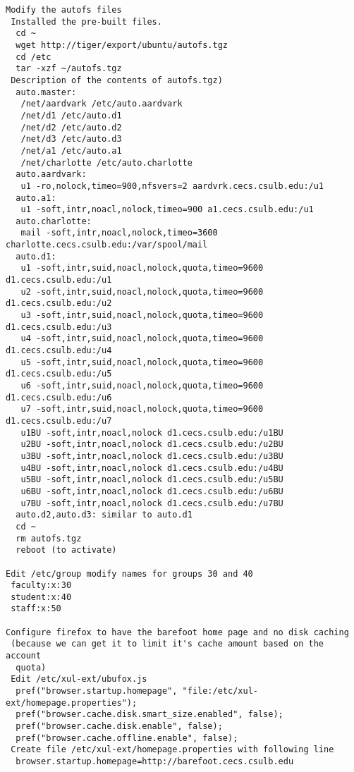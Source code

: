 \begin{verbatim}
Modify the autofs files
 Installed the pre-built files.
  cd ~
  wget http://tiger/export/ubuntu/autofs.tgz
  cd /etc
  tar -xzf ~/autofs.tgz
 Description of the contents of autofs.tgz)
  auto.master: 
   /net/aardvark /etc/auto.aardvark
   /net/d1 /etc/auto.d1
   /net/d2 /etc/auto.d2
   /net/d3 /etc/auto.d3
   /net/a1 /etc/auto.a1
   /net/charlotte /etc/auto.charlotte
  auto.aardvark:
   u1 -ro,nolock,timeo=900,nfsvers=2 aardvrk.cecs.csulb.edu:/u1
  auto.a1:
   u1 -soft,intr,noacl,nolock,timeo=900 a1.cecs.csulb.edu:/u1
  auto.charlotte:
   mail -soft,intr,noacl,nolock,timeo=3600 charlotte.cecs.csulb.edu:/var/spool/mail
  auto.d1:
   u1 -soft,intr,suid,noacl,nolock,quota,timeo=9600 d1.cecs.csulb.edu:/u1
   u2 -soft,intr,suid,noacl,nolock,quota,timeo=9600 d1.cecs.csulb.edu:/u2
   u3 -soft,intr,suid,noacl,nolock,quota,timeo=9600 d1.cecs.csulb.edu:/u3
   u4 -soft,intr,suid,noacl,nolock,quota,timeo=9600 d1.cecs.csulb.edu:/u4
   u5 -soft,intr,suid,noacl,nolock,quota,timeo=9600 d1.cecs.csulb.edu:/u5
   u6 -soft,intr,suid,noacl,nolock,quota,timeo=9600 d1.cecs.csulb.edu:/u6
   u7 -soft,intr,suid,noacl,nolock,quota,timeo=9600 d1.cecs.csulb.edu:/u7
   u1BU -soft,intr,noacl,nolock d1.cecs.csulb.edu:/u1BU
   u2BU -soft,intr,noacl,nolock d1.cecs.csulb.edu:/u2BU
   u3BU -soft,intr,noacl,nolock d1.cecs.csulb.edu:/u3BU
   u4BU -soft,intr,noacl,nolock d1.cecs.csulb.edu:/u4BU
   u5BU -soft,intr,noacl,nolock d1.cecs.csulb.edu:/u5BU
   u6BU -soft,intr,noacl,nolock d1.cecs.csulb.edu:/u6BU
   u7BU -soft,intr,noacl,nolock d1.cecs.csulb.edu:/u7BU
  auto.d2,auto.d3: similar to auto.d1
  cd ~
  rm autofs.tgz
  reboot (to activate)

Edit /etc/group modify names for groups 30 and 40
 faculty:x:30
 student:x:40
 staff:x:50

Configure firefox to have the barefoot home page and no disk caching
 (because we can get it to limit it's cache amount based on the account
  quota)
 Edit /etc/xul-ext/ubufox.js
  pref("browser.startup.homepage", "file:/etc/xul-ext/homepage.properties");
  pref("browser.cache.disk.smart_size.enabled", false);
  pref("browser.cache.disk.enable", false);
  pref("browser.cache.offline.enable", false);
 Create file /etc/xul-ext/homepage.properties with following line
  browser.startup.homepage=http://barefoot.cecs.csulb.edu
 

\end{verbatim}
